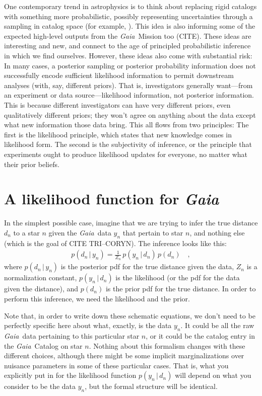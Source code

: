 \documentclass[12pt, modern]{aastex62}
\newcommand{\Gaia}{\textsl{Gaia}}
\newcommand{\given}{\,|\,}
\begin{document}
One contemporary trend in astrophysics is to think about replacing rigid
catalogs with something more probabilistic, possibly representing uncertainties
through a sampling in catalog space (for example, \citealt{brewer, portillo}).
This idea is also informing some of the expected high-level outputs from
the \Gaia\ Mission too (CITE).
These ideas are interesting and new, and connect to the age of principled
probabilistic inference in which we find ourselves.
However, these ideas also come with substantial risk:
In many cases, a posterior sampling or posterior probability information
does not successfully encode sufficient likelihood information to permit
downstream analyses (with, say, different priors).
That is, investigators generally want---from an experiment or data source---likelihood
information, not posterior information.
This is because different investigators can have very different priors,
even qualitatively different priors; they won't agree on anything about the
data except what new information those data bring.
This all flows from two principles: The first is the likelihood principle,
which states that new knowledge comes in likelihood form.
The second is the subjectivity of inference, or the principle that
experiments ought to produce likelihood updates for everyone, no matter
what their prior beliefs.

\section{A likelihood function for \textsl{Gaia}}
In the simplest possible case, imagine that we are trying to infer
the true distance $d_n$ to a star $n$ given the \Gaia\ data $y_n$ that
pertain to star $n$, and nothing else
(which is the goal of CITE TRI--CORYN).
The inference looks like this:
\begin{eqnarray}
p(d_n\given y_n) = \frac{1}{Z_n}\,p(y_n\given d_n)\,p(d_n)
\label{eq:inference}
\quad ,
\end{eqnarray}
where
$p(d_n\given y_n)$ is the posterior pdf for the true distance given the data,
$Z_n$ is a normalization constant,
$p(y_n\given d_n)$ is the likelihood (or the pdf for the data given the distance),
and $p(d_n)$ is the prior pdf for the true distance.
In order to perform this inference, we need the likelihood and the prior.

Note that, in order to write down these schematic equations,
we don't need to be perfectly specific here about what, exactly,
is the data $y_n$.
It could be all the raw \Gaia\ data pertaining to this particular star $n$,
or it could be the catalog entry in the \Gaia\ Catalog on star $n$.
Nothing about this formalism changes with these different choices,
although there might be some implicit marginalizations over nuisance
parameters in some of these particular cases.
That is, what you explicitly put in for the likelihood function $p(y_n\given d_n)$
will depend on what you consider to be the data $y_n$, but the formal structure
will be identical.
\end{document}
